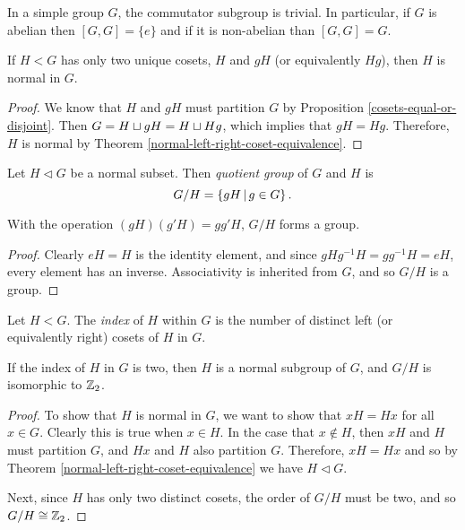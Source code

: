 \begin{cor}
    In a simple group $G$, the commutator subgroup is trivial. In particular, if $G$ is abelian then $[G, G] = \{e\}$ and if it is non-abelian than $[G, G] = G$.
\end{cor}

\begin{prop}
    If $H < G$ has only two unique cosets, $H$ and $gH$ (or equivalently $Hg$), then $H$ is normal in $G$.
\end{prop}

\begin{proof}
    We know that $H$ and $gH$ must partition $G$ by Proposition \ref{cosets-equal-or-disjoint}. Then $G = H \sqcup gH = H \sqcup Hg$, which implies that $gH = Hg$. Therefore, $H$ is normal by Theorem \ref{normal-left-right-coset-equivalence}.
\end{proof}

\begin{defn}
    Let $H \triangleleft G$ be a normal subset. Then \emph{quotient group} of $G$ and $H$ is
    \[G/H = \left\{gH \,\middle|\, g \in G\right\}.\]
\end{defn}

\begin{prop}
    With the operation $(gH)(g'H) = gg'H$, $G/H$ forms a group.
\end{prop}

\begin{proof}
    Clearly $eH = H$ is the identity element, and since
    $gHg^{-1}H = gg^{-1}H = eH$, every element has an inverse. Associativity is inherited from $G$, and so $G/H$ is a group.
\end{proof}

\begin{defn}
    Let $H < G$. The \emph{index} of $H$ within $G$ is the number of distinct left (or equivalently right) cosets of $H$ in $G$.
\end{defn}

\begin{prop}\label{index-two-normal}
    If the index of $H$ in $G$ is two, then $H$ is a normal subgroup of $G$, and $G/H$ is isomorphic to $\mathbb{Z}_2$.
\end{prop}

\begin{proof}
    To show that $H$ is normal in $G$, we want to show that $xH = Hx$ for all $x \in G$. Clearly this is true when $x \in H$. In the case that $x \not\in H$, then $xH$ and $H$ must partition $G$, and $Hx$ and $H$ also partition $G$. Therefore, $xH = Hx$ and so by Theorem \ref{normal-left-right-coset-equivalence} we have $H \triangleleft G$.

    Next, since $H$ has only two distinct cosets, the order of $G/H$ must be two, and so $G/H \cong \mathbb{Z}_2$.
\end{proof}

